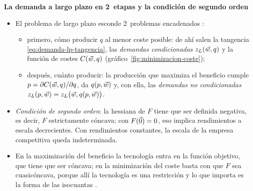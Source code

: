 \documentclass[11pt]{article}
\begin{document}
\begin{anotaciones}
\textbf{La demanda a largo plazo en 2~etapas y la condición de segundo orden}

\begin{itemize}
\item El problema de largo plazo esconde 2~problemas encadenados :
  \begin{itemize}
  \item primero, cómo producir $q$ al menor coste posible: de ahí salen la tangencia \eqref{eq:demanda-lp-tangencia}, las \emph{demandas condicionadas} $z_L(\vec{w},q)$ y la función de costes $C(\vec{w},q)$ (gráfico~\ref{fig:minimizacion-coste});
  \item después, cuánto producir: la producción que maximiza el beneficio cumple $p=\partial C(\vec{w},q)/\partial q$, da $q(p,\vec{w})$ y, con ella, las \emph{demandas no condicionadas} $z_L(p,\vec{w})=z_L\big(\vec{w},q(p,\vec{w})\big)$.
  \end{itemize}
\item \emph{Condición de segundo orden}: la hessiana de $F$ tiene que ser definida negativa, es decir, $F$ estrictamente cóncava; con $F(\vec{0})=0$, eso implica rendimientos a escala decrecientes. Con rendimientos constantes, la escala de la empresa competitiva queda indeterminada.
\item En la maximización del beneficio la tecnología entra en la función objetivo, que tiene que ser cóncava; en la minimización del coste basta con que $F$ sea cuasicóncava, porque allí la tecnología es una restricción y lo que importa es la forma de las isocuantas .
\end{itemize}

\begin{figuracaja}
\caption{Minimización del coste a largo plazo: tangencia de la isocuanta y la isocoste}\label{fig:minimizacion-coste}
\end{figuracaja}
\end{anotaciones}
\end{document}

